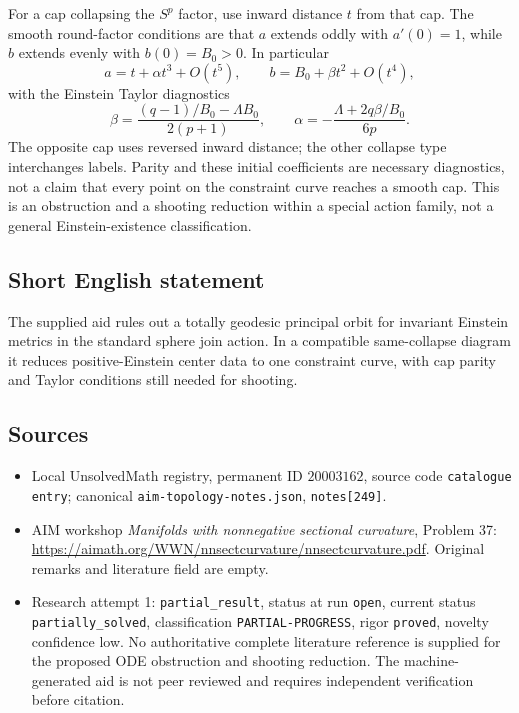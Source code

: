 \documentclass[11pt]{article}
\begin{document}
For a cap collapsing the $S^p$ factor, use inward distance $t$ from that cap. The smooth round-factor conditions are that $a$ extends oddly with $a'(0)=1$, while $b$ extends evenly with $b(0)=B_0>0$. In particular
\[
a=t+\alpha t^3+O(t^5),\qquad b=B_0+\beta t^2+O(t^4),
\]
with the Einstein Taylor diagnostics
\[
\beta=\frac{(q-1)/B_0-\Lambda B_0}{2(p+1)},\qquad
\alpha=-\frac{\Lambda+2q\beta/B_0}{6p}.
\]
The opposite cap uses reversed inward distance; the other collapse type interchanges labels. Parity and these initial coefficients are necessary diagnostics, not a claim that every point on the constraint curve reaches a smooth cap. This is an obstruction and a shooting reduction within a special action family, not a general Einstein-existence classification.
\subsection{Short English statement}
The supplied aid rules out a totally geodesic principal orbit for invariant Einstein metrics in the standard sphere join action. In a compatible same-collapse diagram it reduces positive-Einstein center data to one constraint curve, with cap parity and Taylor conditions still needed for shooting.
\subsection{Sources}
\begin{itemize}
\item Local UnsolvedMath registry, permanent ID $20003162$, source code \texttt{catalogue entry}; canonical \texttt{aim-topology-notes.json}, \texttt{notes[249]}.
\item AIM workshop \emph{Manifolds with nonnegative sectional curvature}, Problem 37: \url{https://aimath.org/WWN/nnsectcurvature/nnsectcurvature.pdf}. Original remarks and literature field are empty.
\item Research attempt 1: \texttt{partial\_result}, status at run \texttt{open}, current status \texttt{partially\_solved}, classification \texttt{PARTIAL-PROGRESS}, rigor \texttt{proved}, novelty confidence low. No authoritative complete literature reference is supplied for the proposed ODE obstruction and shooting reduction. The machine-generated aid is not peer reviewed and requires independent verification before citation.
\end{itemize}
\end{document}
